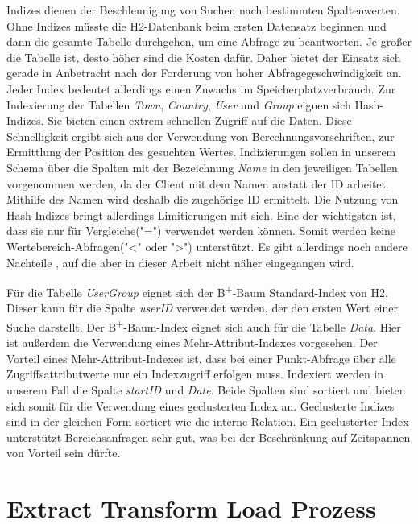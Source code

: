 Indizes dienen der Beschleunigung von Suchen nach bestimmten Spaltenwerten. Ohne Indizes müsste die H2-Datenbank beim ersten Datensatz beginnen und dann die gesamte Tabelle durchgehen, um eine Abfrage zu beantworten. Je größer die Tabelle ist, desto höher sind die Kosten dafür. Daher bietet der Einsatz sich gerade in Anbetracht nach der Forderung von hoher Abfragegeschwindigkeit an. Jeder Index bedeutet allerdings einen Zuwachs im Speicherplatzverbrauch. Zur Indexierung der Tabellen \textit{Town}, \textit{Country}, \textit{User} und \textit{Group} eignen sich Hash-Indizes. Sie bieten einen extrem schnellen Zugriff auf die Daten. Diese Schnelligkeit ergibt sich aus der Verwendung von Berechnungsvorschriften, zur Ermittlung der Position des gesuchten Wertes. Indizierungen sollen in unserem Schema über die Spalten mit der Bezeichnung \textit{Name} in den jeweiligen Tabellen vorgenommen werden, da der Client mit dem Namen anstatt der ID arbeitet. Mithilfe des Namen wird deshalb die zugehörige ID ermittelt. Die Nutzung von Hash-Indizes bringt allerdings Limitierungen mit sich. Eine der wichtigsten ist, dass sie nur für Vergleiche("=") verwendet werden können. Somit werden keine Wertebereich-Abfragen("<" oder ">") unterstützt. Es gibt allerdings noch andere Nachteile \cite{SWB-352401869}, auf die aber in dieser Arbeit nicht näher eingegangen wird. 

Für die Tabelle \textit{UserGroup} eignet sich der B\textsuperscript{+}-Baum Standard-Index von H2. Dieser kann für die Spalte \textit{userID} verwendet werden, der den ersten Wert einer Suche darstellt. Der B\textsuperscript{+}-Baum-Index eignet sich auch für die Tabelle \textit{Data}. Hier ist außerdem die Verwendung eines Mehr-Attribut-Indexes vorgesehen. Der Vorteil eines Mehr-Attribut-Indexes ist, dass bei einer Punkt-Abfrage über alle Zugriffsattributwerte nur ein Indexzugriff erfolgen muss. Indexiert werden in unserem Fall die Spalte \textit{startID} und \textit{Date}. Beide Spalten sind sortiert und bieten sich somit für die Verwendung eines geclusterten Index an. Geclusterte Indizes sind in der gleichen Form sortiert wie die interne Relation. Ein geclusterter Index unterstützt Bereichsanfragen sehr gut, was bei der Beschränkung auf Zeitspannen von Vorteil sein dürfte.       


\section{Extract Transform Load Prozess}

